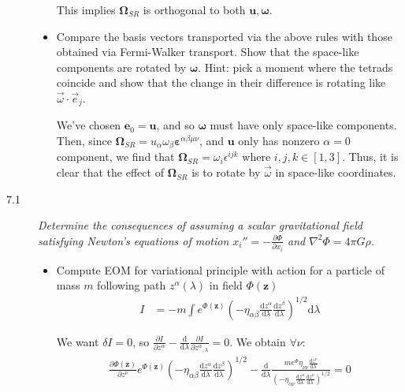 \documentclass[12pt]{report}
\newcommand{\rd}[2]{\frac{\mathrm{d}#1}{\mathrm{d}#2}}
\newcommand{\pd}[2]{\frac{\partial#1}{\partial#2}}
\newcommand{\bm}[1]{\boldsymbol{\mathbf{#1}}}
\begin{document}
\begin{description}
\begin{itemize}
                This implies $\bm{\Omega}_{SR}$ is orthogonal to both
                $\bm{u}, \bm{\omega}$.

            \item Compare the basis vectors transported via the above rules with
                those obtained via Fermi-Walker transport. Show that the
                space-like components are rotated by $\bm{\omega}$. Hint:
                pick a moment where the tetrads coincide and show that the
                change in their difference is rotating like $\vec{\omega} \cdot
                \vec{e}_{j}$.

                We've chosen $\bm{e}_0 = \bm{u}$, and so $\bm{\omega}$ must have
                only space-like components. Then, since $\bm{\Omega}_{SR} =
                u_\alpha \omega_\beta \bm{\varepsilon}^{\alpha \beta \mu \nu}$,
                and $\bm{u}$ only has nonzero $\alpha = 0$ component, we find
                that $\bm{\Omega}_{SR} = \omega_i \epsilon^{ijk}$ where $i,j,k
                \in [1,3]$. Thus, it is clear that the effect of
                $\bm{\Omega}_{SR}$ is to rotate by $\vec{\omega}$ in space-like
                coordinates.
        \end{itemize}

    \item[7.1] \emph{Determine the consequences of assuming a scalar
        gravitational field satisfying Newton's equations of motion $x_i'' =
        -\pd{\Phi}{x_i}$ and $\nabla^2 \Phi = 4\pi G \rho$.}

        \begin{itemize}
            \item Compute EOM for variational principle with action for a
                particle of mass $m$ following path $z^\alpha(\lambda)$ in field
                $\Phi(\bm{z})$
                \begin{align*}
                    I &= -m\int e^{\Phi(\bm{z})} \left(
                        -\eta_{\alpha\beta} \rd{z^\alpha}{\lambda}
                        \rd{z^\beta}{\lambda}
                    \right)^{1/2} \mathrm{d}\lambda
                \end{align*}

                We want $\delta I = 0$, so $\pd{I}{z^\alpha} -
                \rd{}{\lambda}\pd{I}{{z^\alpha}_{,\lambda}} = 0$. We obtain
                $\forall \nu$:
                \begin{align*}
                    \pd{\Phi(\bm{z})}{z^\nu}e^{\Phi(\bm{z})}
                    \left( -\eta_{\alpha\beta}
                        \rd{z^\alpha}{\lambda}
                        \rd{z^\beta}{\lambda}\right)^{1/2} -
                    \rd{}{\lambda}
                    \frac{me^\Phi \eta_{\nu\nu}\rd{z^\nu}{\lambda}}
                        {\left( -\eta_{\alpha\nu}
                        \rd{z^\alpha}{\lambda}
                        \rd{z^\nu}{\lambda}\right)^{1/2}}
                    = 0
                \end{align*}


\end{itemize}
\end{description}
\end{document}
